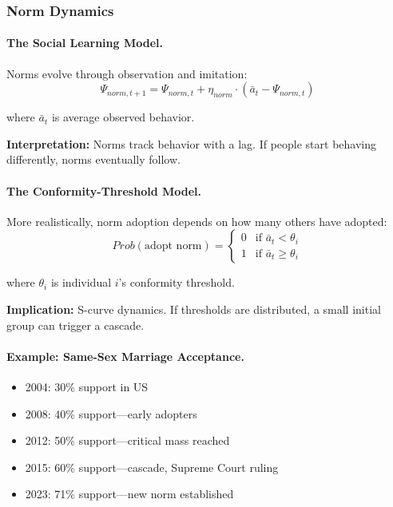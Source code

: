 \documentclass[12pt,a4paper]{article}
\begin{document}
\subsubsection{Norm Dynamics}

\paragraph{The Social Learning Model.}
Norms evolve through observation and imitation:
\begin{equation}
  \Psi_{norm, t+1} = \Psi_{norm, t} + \eta_{norm} \cdot \left( \bar{a}_t - \Psi_{norm, t} \right)
\end{equation}

where $\bar{a}_t$ is average observed behavior.

\textbf{Interpretation:} Norms track behavior with a lag.
If people start behaving differently, norms eventually follow.

\paragraph{The Conformity-Threshold Model.}
More realistically, norm adoption depends on how many others have adopted:
\begin{equation}
  Prob(\text{adopt norm}) = \begin{cases}
    0 & \text{if } \bar{a}_t < \theta_i \\
    1 & \text{if } \bar{a}_t \geq \theta_i
  \end{cases}
\end{equation}

where $\theta_i$ is individual $i$'s conformity threshold.

\textbf{Implication:} S-curve dynamics.
If thresholds are distributed, a small initial group can trigger a cascade.

\paragraph{Example: Same-Sex Marriage Acceptance.}
\begin{itemize}
  \item 2004: 30\% support in US
  \item 2008: 40\% support---early adopters
  \item 2012: 50\% support---critical mass reached
  \item 2015: 60\% support---cascade, Supreme Court ruling
  \item 2023: 71\% support---new norm established
\end{itemize}
\end{document}

